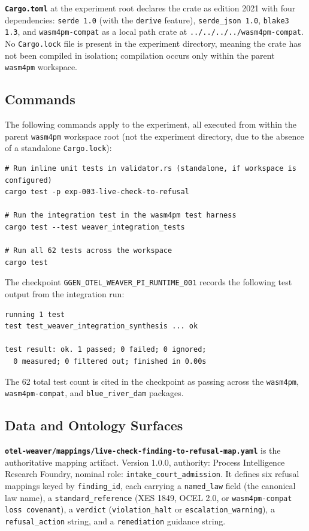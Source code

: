 \textbf{\texttt{Cargo.toml}} at the experiment root declares the crate as edition
2021 with four dependencies: \texttt{serde 1.0} (with the \texttt{derive} feature),
\texttt{serde\_json 1.0}, \texttt{blake3 1.3}, and \texttt{wasm4pm-compat} as a
local path crate at \texttt{../../../../wasm4pm-compat}. No \texttt{Cargo.lock} file
is present in the experiment directory, meaning the crate has not been compiled in
isolation; compilation occurs only within the parent \texttt{wasm4pm} workspace.

\subsection{Commands}
\label{sec:otel-weaver-exp-003-live-check-to-refusal-implementation-commands}

The following commands apply to the experiment, all executed from within the parent
\texttt{wasm4pm} workspace root (not the experiment directory, due to the absence
of a standalone \texttt{Cargo.lock}):

\begin{verbatim}
# Run inline unit tests in validator.rs (standalone, if workspace is configured)
cargo test -p exp-003-live-check-to-refusal

# Run the integration test in the wasm4pm test harness
cargo test --test weaver_integration_tests

# Run all 62 tests across the workspace
cargo test
\end{verbatim}

The checkpoint \texttt{GGEN\_OTEL\_WEAVER\_PI\_RUNTIME\_001} records the following
test output from the integration run:
\begin{verbatim}
running 1 test
test test_weaver_integration_synthesis ... ok

test result: ok. 1 passed; 0 failed; 0 ignored;
  0 measured; 0 filtered out; finished in 0.00s
\end{verbatim}

The 62 total test count is cited in the checkpoint as passing across the
\texttt{wasm4pm}, \texttt{wasm4pm-compat}, and \texttt{blue\_river\_dam} packages.

\subsection{Data and Ontology Surfaces}
\label{sec:otel-weaver-exp-003-live-check-to-refusal-implementation-data}

\textbf{\texttt{otel-weaver/mappings/live-check-finding-to-refusal-map.yaml}} is
the authoritative mapping artifact. Version 1.0.0, authority: Process Intelligence
Research Foundry, nominal role: \texttt{intake\_court\_admission}. It defines six
refusal mappings keyed by \texttt{finding\_id}, each carrying a \texttt{named\_law}
field (the canonical law name), a \texttt{standard\_reference} (XES 1849, OCEL 2.0,
or \texttt{wasm4pm-compat loss covenant}), a \texttt{verdict}
(\texttt{violation\_halt} or \texttt{escalation\_warning}), a \texttt{refusal\_action}
string, and a \texttt{remediation} guidance string.

